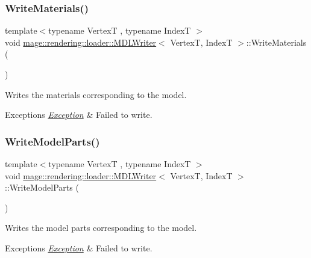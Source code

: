 \subsubsection{\texorpdfstring{Write\+Materials()}{WriteMaterials()}}
{\footnotesize\ttfamily template$<$typename VertexT , typename IndexT $>$ \\
void \mbox{\hyperlink{classmage_1_1rendering_1_1loader_1_1_m_d_l_writer}{mage\+::rendering\+::loader\+::\+M\+D\+L\+Writer}}$<$ VertexT, IndexT $>$\+::Write\+Materials (\begin{DoxyParamCaption}{ }\end{DoxyParamCaption})\hspace{0.3cm}{\ttfamily [private]}}

Writes the materials corresponding to the model.


\begin{DoxyExceptions}{Exceptions}
{\em \mbox{\hyperlink{classmage_1_1_exception}{Exception}}} & Failed to write. \\
\hline
\end{DoxyExceptions}
\mbox{\label{classmage_1_1rendering_1_1loader_1_1_m_d_l_writer_a8fcd997a51d7a46149596d332ebdb8e1}} 
\subsubsection{\texorpdfstring{Write\+Model\+Parts()}{WriteModelParts()}}
{\footnotesize\ttfamily template$<$typename VertexT , typename IndexT $>$ \\
void \mbox{\hyperlink{classmage_1_1rendering_1_1loader_1_1_m_d_l_writer}{mage\+::rendering\+::loader\+::\+M\+D\+L\+Writer}}$<$ VertexT, IndexT $>$\+::Write\+Model\+Parts (\begin{DoxyParamCaption}{ }\end{DoxyParamCaption})\hspace{0.3cm}{\ttfamily [private]}}

Writes the model parts corresponding to the model.


\begin{DoxyExceptions}{Exceptions}
{\em \mbox{\hyperlink{classmage_1_1_exception}{Exception}}} & Failed to write. \\
\hline
\end{DoxyExceptions}
\mbox{\label{classmage_1_1rendering_1_1loader_1_1_m_d_l_writer_ac01e930b55888da88e345b0910d4b1c2}} 
